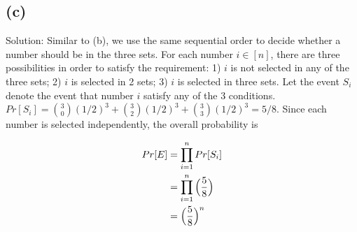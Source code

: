 \documentclass[10pt]{537homework}
\begin{document}
\subsection*{(c)} Solution: Similar to (b), we use the same sequential order to decide whether a number should be in the three sets. For each number $i \in [n]$, there are three possibilities in order to satisfy the requirement: 1) $i$ is not selected in any of the three sets; 2) $i$ is selected in 2 sets; 3) $i$ is selected in three sets. Let the event $S_i$ denote the event that number $i$ satisfy any of the 3 conditions. $Pr[S_i] = {3 \choose 0}(1/2)^3 + {3 \choose 2}(1/2)^3 + {3 \choose 3}(1/2)^3 = 5/8$. Since each number is selected independently, the overall probability is 

\begin{align}
	Pr[E] 	& = \prod_{i=1}^n Pr[S_i] \\
			& = \prod_{i=1}^n \Big( {5 \over 8} \Big) \\
			& = \Big( {5 \over 8} \Big)^n
\end{align}
\end{document}
